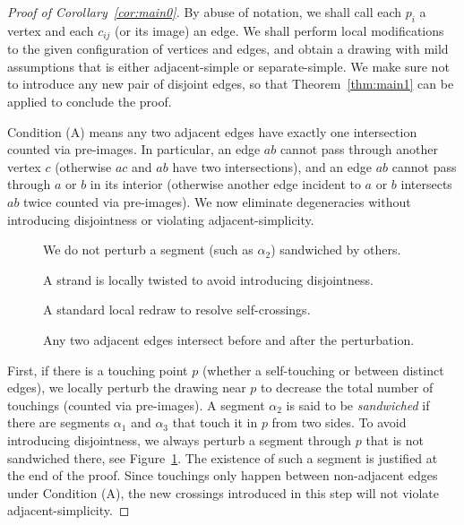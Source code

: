 \documentclass[10pt,a4paper]{amsart}
\begin{document}
\begin{proof}[Proof of Corollary~\ref{cor:main0}]
By abuse of notation, we shall call each $p_i$ a vertex and each $c_{ij}$ (or its image) an edge. We shall perform local modifications to the given configuration of vertices and edges, and obtain a drawing with mild assumptions that is either adjacent-simple or separate-simple. We make sure not to introduce any new pair of disjoint edges, so that Theorem~\ref{thm:main1} can be applied to conclude the proof.

Condition (A) means any two adjacent edges have exactly one intersection counted via pre-images. In particular, an edge $ab$ cannot pass through another vertex $c$ (otherwise $ac$ and $ab$ have two intersections), and an edge $ab$ cannot pass through $a$ or $b$ in its interior (otherwise another edge incident to $a$ or $b$ intersects $ab$ twice counted via pre-images). We now eliminate degeneracies without introducing disjointness or violating adjacent-simplicity.

\begin{figure}[ht]
    \centering
    
    \caption{We do not perturb a segment (such as $\alpha_2$) sandwiched by others.}
    \label{fig:perturb_touch}
\end{figure}

\begin{figure}[ht]
    \centering
    
    \caption{A strand is locally twisted to avoid introducing disjointness.}
    \label{fig:unpack}
\end{figure}

\begin{figure}[ht]
    \centering
    
    \caption{A standard local redraw to resolve self-crossings.}
    \label{fig:selfcross}
\end{figure}

\begin{figure}[ht]
    \centering
    
    \caption{Any two adjacent edges intersect before and after the perturbation.}
    \label{fig:perturb_block}
\end{figure}

First, if there is a touching point $p$ (whether a self-touching or between distinct edges), we locally perturb the drawing near $p$ to decrease the total number of touchings (counted via pre-images). A segment $\alpha_2$ is said to be \textit{sandwiched} if there are segments $\alpha_1$ and $\alpha_3$ that touch it in $p$ from two sides. To avoid introducing disjointness, we always perturb a segment through $p$ that is not sandwiched there, see Figure~\ref{fig:perturb_touch}. The existence of such a segment is justified at the end of the proof. Since touchings only happen between non-adjacent edges under Condition (A), the new crossings introduced in this step will not violate adjacent-simplicity.


\end{proof}
\end{document}
